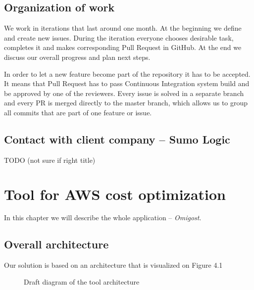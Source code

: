 \documentclass[licencjacka,en]{thesisclass}
\begin{document}
    \section{Organization of work}

    We work in iterations that last around one month.
    At the beginning we define and create new issues.
    During the iteration everyone chooses desirable task, completes it and makes corresponding Pull Request in GitHub.
    At the end we discuss our overall progress and plan next steps.

    In order to let a new feature become part of the repository it has to be accepted.
    It means that Pull Request has to pass Continuous Integration system build and be approved by one of the reviewers.
    Every issue is solved in a separate branch and every PR is merged directly to the master branch, which allows us to group all commits that are part of one feature or issue.

    \section{Contact with client company -- Sumo Logic}

    TODO (not sure if right title)

    \chapter{Tool for AWS cost optimization}

    In this chapter we will describe the whole application -- \textit{Omigost}.

    \section{Overall architecture}
    Our solution is based on an architecture that is visualized on Figure 4.1

    \begin{figure}[!htb]
      \caption{\label{fig:arch-diag} Draft diagram of the tool architecture}
    \end{figure}
\end{document}
